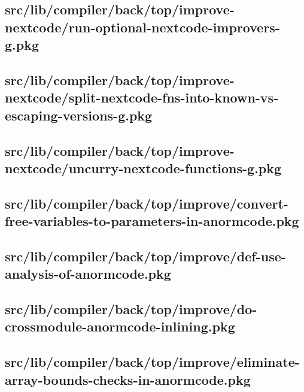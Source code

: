 \subsection{src/lib/compiler/back/top/improve-nextcode/run-optional-nextcode-improvers-g.pkg}


\subsection{src/lib/compiler/back/top/improve-nextcode/split-nextcode-fns-into-known-vs-escaping-versions-g.pkg}


\subsection{src/lib/compiler/back/top/improve-nextcode/uncurry-nextcode-functions-g.pkg}


\subsection{src/lib/compiler/back/top/improve/convert-free-variables-to-parameters-in-anormcode.pkg}


\subsection{src/lib/compiler/back/top/improve/def-use-analysis-of-anormcode.pkg}


\subsection{src/lib/compiler/back/top/improve/do-crossmodule-anormcode-inlining.pkg}


\subsection{src/lib/compiler/back/top/improve/eliminate-array-bounds-checks-in-anormcode.pkg}


